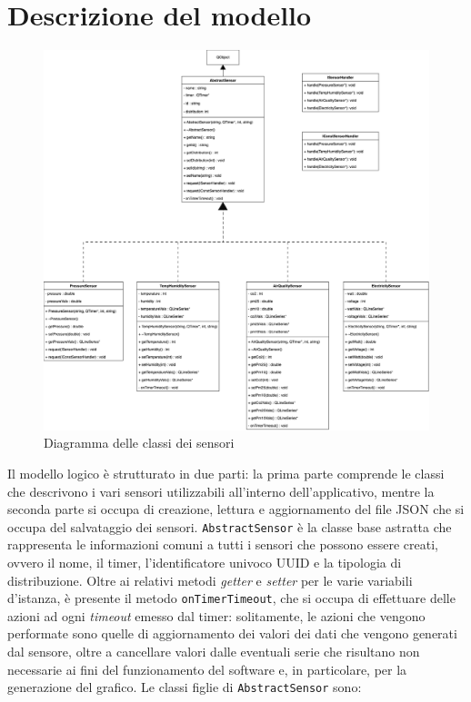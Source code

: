\documentclass[a4paper, 12pt]{article}
\begin{document}
    \section{Descrizione del modello}
    \begin{figure}[H]
        \centering
        \includegraphics[scale=0.28]{assets/UML.png}
        \caption{Diagramma delle classi dei sensori}
    \end{figure}
    Il modello logico è strutturato in due parti: la prima parte comprende le classi che descrivono i vari sensori utilizzabili all'interno dell'applicativo, mentre la seconda parte si occupa di creazione, lettura e aggiornamento del file JSON che si occupa del salvataggio dei sensori.
    \texttt{AbstractSensor} è la classe base astratta che rappresenta le informazioni comuni a tutti i sensori che possono essere creati, ovvero il nome, il timer, l'identificatore univoco UUID e la tipologia di distribuzione. Oltre ai relativi metodi \emph{getter} e \emph{setter} per le varie variabili d'istanza, 
    è presente il metodo \texttt{onTimerTimeout}, che si occupa di effettuare delle azioni ad ogni \emph{timeout} emesso dal timer: solitamente, le azioni che vengono performate sono quelle di aggiornamento dei valori dei dati che vengono generati dal sensore, oltre a cancellare valori dalle eventuali serie che risultano non necessarie ai fini del funzionamento del software e, in particolare, per la generazione del grafico. Le classi figlie di \texttt{AbstractSensor} sono:
\end{document}
